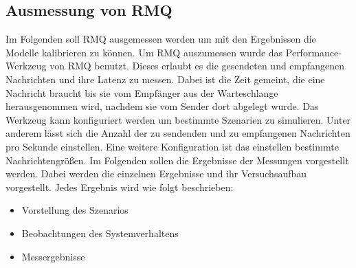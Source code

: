 \subsection{Ausmessung von RMQ}
\label{sec:rmqBenchmark}
Im Folgenden soll RMQ ausgemessen werden um mit den Ergebnissen die Modelle kalibrieren zu können. Um RMQ auszumessen wurde das Performance-Werkzeug von RMQ benutzt. Dieses erlaubt es die gesendeten und empfangenen Nachrichten und ihre Latenz zu messen. Dabei ist die Zeit gemeint, die eine Nachricht braucht bis sie vom Empfänger aus der Warteschlange herausgenommen wird, nachdem sie vom Sender dort abgelegt wurde. Das Werkzeug kann konfiguriert werden um bestimmte Szenarien zu simulieren. Unter anderem lässt sich die Anzahl der zu sendenden und zu empfangenen Nachrichten pro Sekunde einstellen. Eine weitere Konfiguration ist das einstellen bestimmte Nachrichtengrößen. Im Folgenden sollen die Ergebnisse der Messungen vorgestellt werden. Dabei werden die einzelnen Ergebnisse und ihr Versuchsaufbau vorgestellt. Jedes Ergebnis wird wie folgt beschrieben: 
\begin{itemize}
    \item Vorstellung des Szenarios
    \item Beobachtungen des Systemverhaltens
    \item Messergebnisse
\end{itemize}



